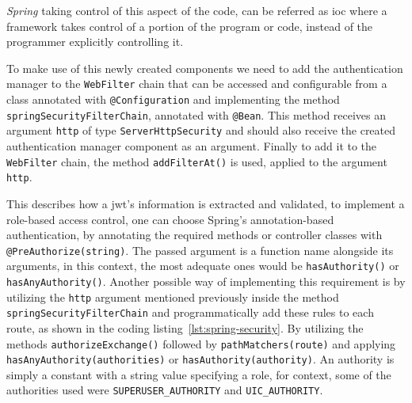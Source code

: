 \textit{Spring} taking control of this aspect of the code, can be referred as \acrfull{ioc} where a framework takes control of a portion of the program or code, instead of the programmer explicitly controlling it.

 
To make use of this newly created components we need to add the authentication manager to the \texttt{WebFilter} chain that can be accessed and configurable from a class annotated with \lstinline{@Configuration} and implementing the method \lstinline{springSecurityFilterChain}, annotated with \lstinline{@Bean}. 
This method receives an argument \lstinline{http} of type \lstinline{ServerHttpSecurity} and should also receive the created authentication manager component as an argument. 
Finally to add it to the \texttt{WebFilter} chain, the method \lstinline{addFilterAt()} is used, applied to the argument \lstinline{http}. 

This describes how a \acrshort{jwt}'s information is extracted and validated, to implement a role-based access control, one can choose Spring's annotation-based authentication, by annotating the required methods or controller classes with \lstinline{@PreAuthorize(string)}. The passed argument is a function name alongside its arguments, in this context, the most adequate ones would be \lstinline{hasAuthority()} or \lstinline{hasAnyAuthority()}. Another possible way of implementing this requirement is by utilizing the \texttt{http} argument mentioned previously inside the method \lstinline{springSecurityFilterChain} and programmatically add these rules to each route, as shown in the coding listing~\ref{lst:spring-security}. By utilizing the methods \lstinline{authorizeExchange()} followed by \lstinline{pathMatchers(route)} and applying \lstinline{hasAnyAuthority(authorities)} or \lstinline{hasAuthority(authority)}. An authority is simply a constant with a string value specifying a role, for context, some of the authorities used were \texttt{SUPERUSER\_AUTHORITY} and \texttt{UIC\_AUTHORITY}. 


